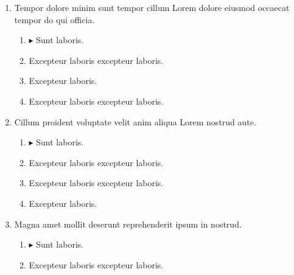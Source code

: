\documentclass[a4paper,12pt]{article}
\begin{document}
\begin{enumerate}[label=\textbf{\arabic*.}]
\begin{multicols}{2}
\begin{enumerate}
		\item $\blacktriangleright$  Sunt laboris.
    
		\item  Excepteur laboris excepteur laboris.
  
	\end{enumerate}

\end{multicols}
\item Tempor dolore minim sunt tempor cillum Lorem dolore eiusmod occaecat tempor do qui officia.
\begin{multicols}{2}
	\begin{enumerate}
		\item $\blacktriangleright$  Sunt laboris.
    
		\item  Excepteur laboris excepteur laboris.
    
		\item  Excepteur laboris.
    
		\item  Excepteur laboris excepteur laboris.
  
	\end{enumerate}

\end{multicols}
\item Cillum proident voluptate velit anim aliqua Lorem nostrud aute.
\begin{multicols}{2}
	\begin{enumerate}
		\item $\blacktriangleright$  Sunt laboris.
    
		\item  Excepteur laboris excepteur laboris.
    
		\item  Excepteur laboris excepteur laboris.
  
		\item  Excepteur laboris.
    
	\end{enumerate}

\end{multicols}
\item Magna amet mollit deserunt reprehenderit ipsum in nostrud.
\begin{multicols}{2}
	\begin{enumerate}
		\item $\blacktriangleright$  Sunt laboris.
    
		\item  Excepteur laboris excepteur laboris.
  

\end{enumerate}
\end{multicols}
\end{enumerate}
\end{document}
